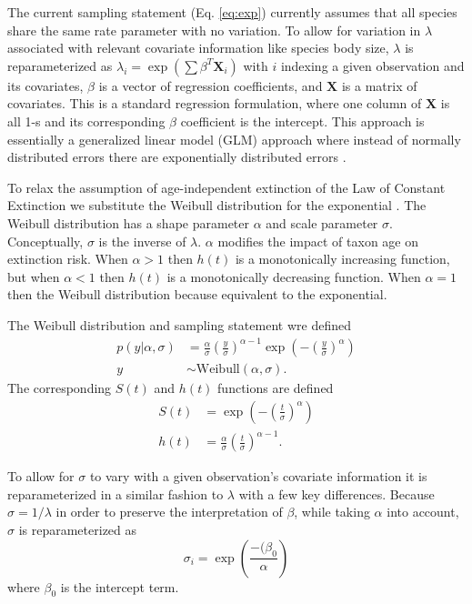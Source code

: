 \documentclass{article}
\begin{document}
The current sampling statement (Eq. \ref{eq:exp}) currently assumes that all species share the same rate parameter with no variation. To allow for variation in \(\lambda\) associated with relevant covariate information like species body size, \(\lambda\) is reparameterized as \(\lambda_{i} = \exp(\sum \beta^{T}\mathbf{X}_{i})\) with \(i\) indexing a given observation and its covariates, \(\beta\) is a vector of regression coefficients, and \(\mathbf{X}\) is a matrix of covariates. This is a standard regression formulation, where one column of \(\mathbf{X}\) is all 1-s and its corresponding \(\beta\) coefficient is the intercept. This approach is essentially a generalized linear model (GLM) approach where instead of normally distributed errors there are exponentially distributed errors \cite{Klein2003}.

To relax the assumption of age-independent extinction of the Law of Constant Extinction we substitute the Weibull distribution for the exponential \cite{Klein2003}. The Weibull distribution has a shape parameter \(\alpha\) and scale parameter \(\sigma\). Conceptually, \(\sigma\) is the inverse of \(\lambda\). \(\alpha\) modifies the impact of taxon age on extinction risk. When \(\alpha > 1\) then \(h(t)\) is a monotonically increasing function, but when \(\alpha < 1\) then \(h(t)\) is a monotonically decreasing function. When \(\alpha = 1\) then the Weibull distribution because equivalent to the exponential.

The Weibull distribution and sampling statement wre defined
\begin{align}
  p(y | \alpha, \sigma) &= \frac{\alpha}{\sigma} \left(\frac{y}{\sigma}\right)^{\alpha - 1} \exp\left(-\left(\frac{y}{\sigma}\right)^{\alpha}\right) \nonumber \\
  y &\sim \mathrm{Weibull}(\alpha, \sigma).
  \label{eq:weibull}
\end{align}
The corresponding \(S(t)\) and \(h(t)\) functions are defined
\begin{align}
  S(t) &= \exp\left(-\left(\frac{t}{\sigma}\right)^{\alpha}\right) \label{eq:wei_surv} \\
  h(t) &= \frac{\alpha}{\sigma}\left(\frac{t}{\sigma}\right)^{\alpha - 1} \label{eq:wei_haz}.
\end{align}

To allow for \(\sigma\) to vary with a given observation's covariate information it is reparameterized in a similar fashion to \(\lambda\) with a few key differences. Because \(\sigma = 1/\lambda\) in order to preserve the interpretation of \(\beta\), while taking \(\alpha\) into account, \(\sigma\) is reparameterized as
\begin{equation}
  \sigma_{i} = \exp\left(\frac{-(\beta_{0}}{\alpha}\right)
  \label{eq:reg}
\end{equation}
where \(\beta_{0}\) is the intercept term.
\end{document}
